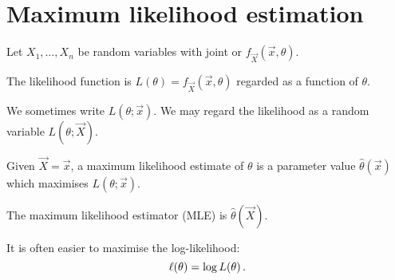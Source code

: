 \section{Maximum likelihood estimation}
Let $X_1, \dotsc, X_n$ be random variables with joint \pdf or \pmf $f_{\vec{X}}(\vec{x}, \theta)$.

\begin{definition}
  The likelihood function is $L(\theta) = f_{\vec{X}}(\vec{x}, \theta)$ regarded as a function of $\theta$.
\end{definition}

We sometimes write $L(\theta; \vec{x})$. We may regard the likelihood as a random variable $L(\theta; \vec{X})$.

\begin{definition}
  Given $\vec{X} = \vec{x}$, a maximum likelihood estimate of $\theta$ is a parameter value $\hat{\theta}(\vec{x})$ which maximises $L(\theta; \vec{x})$.

  The maximum likelihood estimator (MLE) is $\hat{\theta}(\vec{X})$.
\end{definition}

It is often easier to maximise the log-likelihood:
\[
\ell(\theta) = \log L(\theta) \, {.}
\]

